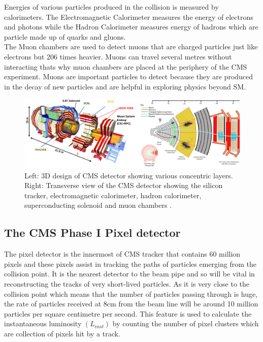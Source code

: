 Energies of various particles produced in the collision is measured by calorimeters. The Electromagnetic Calorimeter measures the energy of electrons and photons while the Hadron Calorimeter measures energy of hadrons which are particle made up of quarks and gluons. \\

The Muon chambers are used to detect muons that are charged particles just like electrons but 206 times heavier. Muons can travel several metres without interacting thats why muon chambers are placed at the periphery of the CMS experiment. Muons are important particles to detect because they are produced in the decay of new particles and are helpful in exploring physics beyond SM.



\begin{figure}[H]
  \centering
  \includegraphics[width=1\columnwidth]{./cmsdetector_merged.png}
  \caption{ \onehalfspacing Left: 3D design of CMS detector showing various concentric layers. Right: Transverse view of the CMS detector showing the silicon tracker, electromagnetic calorimeter, hadron calorimeter, superconducting solenoid and muon chambers \cite{Chatrchyan:2008aa}.}
  \label{fig:CMSdetector}
\end{figure}



\subsection{The CMS Phase I Pixel detector}

The pixel detector is the innermost of CMS tracker that contains 60 million pixels and these pixels assist in tracking the paths of particles emerging from the collision point. It is the nearest detector to the beam pipe and so will be vital in reconstructing the tracks of very short-lived particles. As it is very close to the collision point which means that the number of particles passing through is huge, the rate of particles received at 8cm from the beam line will be around 10 million particles per square centimetre per second. This feature is used to calculate the instantaneous luminosity $(L_{inst})$ by counting the number of pixel clusters which are collection of pixels hit by a track.  \\

